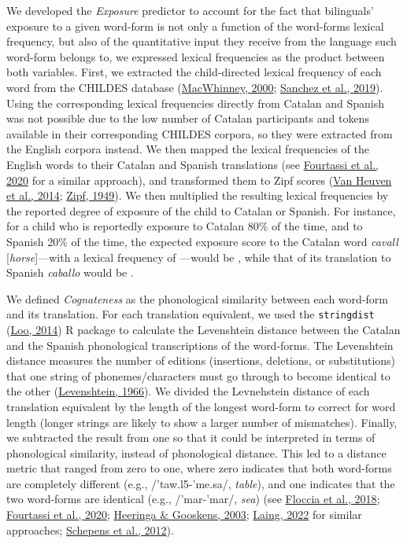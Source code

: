 \documentclass[
]{article}
\begin{document}
We developed the \emph{Exposure} predictor to account for the fact that
bilinguals' exposure to a given word-form is not only a function of the
word-forms lexical frequency, but also of the quantitative input they
receive from the language such word-form belongs to, we expressed
lexical frequencies as the product between both variables. First, we
extracted the child-directed lexical frequency of each word from the
CHILDES database
(\protect\hyperlink{ref-macwhinney2000childes}{MacWhinney, 2000};
\protect\hyperlink{ref-sanchez2019childesdb}{Sanchez et al., 2019}).
Using the corresponding lexical frequencies directly from Catalan and
Spanish was not possible due to the low number of Catalan participants
and tokens available in their corresponding CHILDES corpora, so they
were extracted from the English corpora instead. We then mapped the
lexical frequencies of the English words to their Catalan and Spanish
translations (see \protect\hyperlink{ref-fourtassi2020growth}{Fourtassi
et al., 2020} for a similar approach), and transformed them to Zipf
scores (\protect\hyperlink{ref-vanheuven2014subtlexuk}{Van Heuven et
al., 2014}; \protect\hyperlink{ref-zipf1949human}{Zipf, 1949}). We then
multiplied the resulting lexical frequencies by the reported degree of
exposure of the child to Catalan or Spanish. For instance, for a child
who is reportedly exposure to Catalan 80\% of the time, and to Spanish
20\% of the time, the expected exposure score to the Catalan word
\emph{cavall} {[}\emph{horse}{]}---with a lexical frequency of ---would
be , while that of its translation to Spanish \emph{caballo} would be .

We defined \emph{Cognateness} as the phonological similarity between
each word-form and its translation. For each translation equivalent, we
used the \texttt{stringdist}
(\protect\hyperlink{ref-vanderloo2014stringdist}{Loo, 2014}) R package
to calculate the Levenshtein distance between the Catalan and the
Spanish phonological transcriptions of the word-forms. The Levenshtein
distance measures the number of editions (insertions, deletions, or
substitutions) that one string of phonemes/characters must go through to
become identical to the other
(\protect\hyperlink{ref-levenshtein1966binary}{Levenshtein, 1966}). We
divided the Levnehstein distance of each translation equivalent by the
length of the longest word-form to correct for word length (longer
strings are likely to show a larger number of mismatches). Finally, we
subtracted the result from one so that it could be interpreted in terms
of phonological similarity, instead of phonological distance. This led
to a distance metric that ranged from zero to one, where zero indicates
that both word-forms are completely different (e.g., /'taw.l5-'me.sa/,
\emph{table}), and one indicates that the two word-forms are identical
(e.g., /'mar-'mar/, \emph{sea}) (see
\protect\hyperlink{ref-floccia2018introduction}{Floccia et al., 2018};
\protect\hyperlink{ref-fourtassi2020growth}{Fourtassi et al., 2020};
\protect\hyperlink{ref-heeringa2003norwegian}{Heeringa \& Gooskens,
2003}; \protect\hyperlink{ref-laing2022phonological}{Laing, 2022} for
similar approaches;
\protect\hyperlink{ref-schepens2012distributions}{Schepens et al.,
2012}).
\end{document}
